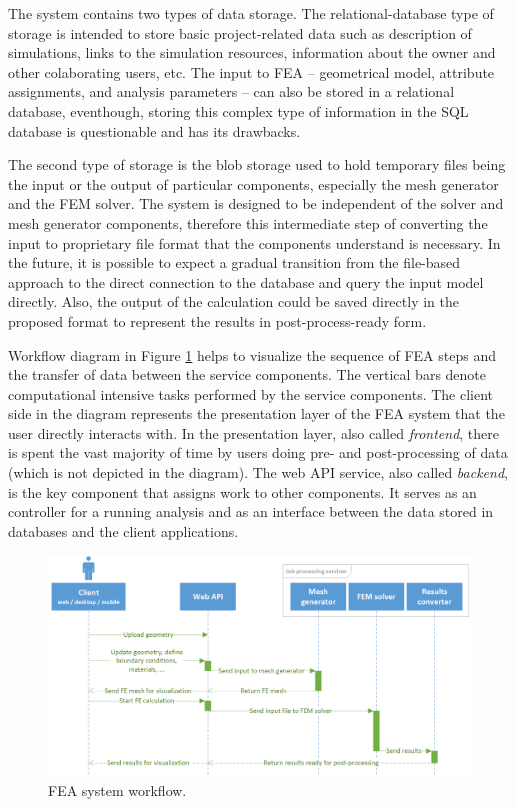The system contains two types of data storage. The relational-database type of storage is intended to store basic project-related data such as description of simulations, links to the simulation resources, information about the owner and other colaborating users, etc. The input to FEA -- geometrical model, attribute assignments, and analysis parameters -- can also be stored in a relational database, eventhough, storing this complex type of information in the SQL database is questionable and has its drawbacks.

The second type of storage is the blob storage used to hold temporary files being the input or the output of particular components, especially the mesh generator and the FEM solver. The system is designed to be independent of the solver and mesh generator components, therefore this intermediate step of converting the input to proprietary file format that the components understand is necessary. In the future, it is possible to expect a gradual transition from the file-based approach to the direct connection to the database and query the input model directly. Also, the output of the calculation could be saved directly in the proposed format to represent the results in post-process-ready form.

Workflow diagram in Figure \ref{fig:FEA-workflow} helps to visualize the sequence of FEA steps and the transfer of data between the service components. The vertical bars denote computational intensive tasks performed by the service components. The client side in the diagram represents the presentation layer of the FEA system that the user directly interacts with. In the presentation layer, also called \textit{frontend}, there is spent the vast majority of time by users doing pre- and post-processing of data (which is not depicted in the diagram). The web API service, also called \textit{backend}, is the key component that assigns work to other components. It serves as an controller for a running analysis and as an interface between the data stored in databases and the client applications.

\begin{figure}[H]
    \centering
    \includegraphics[width=\textwidth]{figures/chapter-data-management/FEA-workflow}
    \decoRule
    \caption{FEA system workflow.}
    \label{fig:FEA-workflow}
\end{figure}

